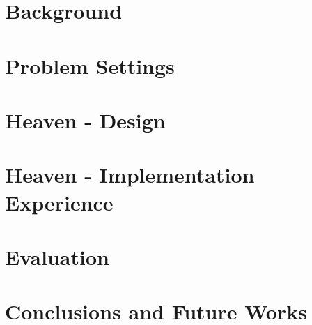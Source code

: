 \documentclass[12pt,a4paper,twoside,openright]{report}
\begin{document}
\chapter{Background}
\label{chap:background}


\chapter{Problem Settings}
\label{chap:problem-settings}



\chapter{Heaven - Design}
\label{chap:heaven}



\chapter{Heaven - Implementation Experience}
\label{chap:implementation-experience}




\chapter{Evaluation}
\label{chap:evaluation}



\chapter{Conclusions and Future Works}
\label{chap:conclusions}

\end{document}
